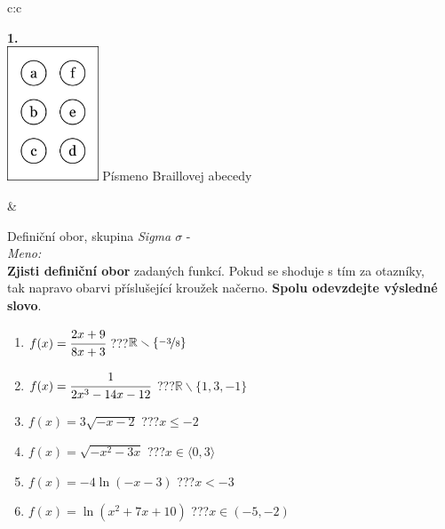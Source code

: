\documentclass[10pt]{report}
\begin{document}
\begin{tabular}{c:c}
\begin{minipage}[c][99mm][t]{0.49\linewidth}
\begin{center}
\begin{minipage}{0.20\linewidth}
\begin{center}
{\Huge\bfseries 1.} \\[2mm]
\includegraphics[height=40mm]{../images/braille.png}
{\small Písmeno Braillovej abecedy}
\end{center}
\end{minipage}
\end{center}
\end{minipage}
&
\begin{minipage}[c][99mm][t]{0.49\linewidth}
\begin{center}
\vspace{7mm}
{\huge Definiční obor, skupina \textit{Sigma $\sigma$} -}\\[4.5mm]
\textit{Meno:}\phantom{xxxxxxxxxxxxxxxxxxxxxxxxxxxxxxxxxxxxxxxxxxxxxxxxxxxxxxxxxxxxxxxxx}\\[3.5mm]
\textbf{Zjisti definiční obor} zadaných funkcí. Pokud se shoduje s tím za otazníky,\\tak napravo obarvi příslušející kroužek načerno. \textbf{Spolu odevzdejte výsledné slovo}.\\[3mm]
\begin{minipage}{0.77\linewidth}
\begin{center}
\begin{varwidth}{\textwidth}
\begin{enumerate}
\normalsize
\item $f(x)=\cfrac{2x+9}{8x+3}$\quad \dotfill\; ???\;\dotfill \quad $\mathbb{R}\smallsetminus\{\nicefrac{-3}{8}\}$
\item $f(x)=\cfrac{1}{2x^3-14x-12}$\quad \dotfill\; ???\;\dotfill \quad $\mathbb{R}\smallsetminus\{1,3,-1\}$
\item $f(x)=3\sqrt{-x-2}$\quad \dotfill\; ???\;\dotfill \quad $x\leq-2$
\item $f(x)=\sqrt{-x^2-3x}$\quad \dotfill\; ???\;\dotfill \quad $x\in\langle0 , 3\rangle$
\item $f(x)=-4\ln{(-x-3)}$\quad \dotfill\; ???\;\dotfill \quad $x<-3$
\item $f(x)=\ln{(x^2+7x+10)}$\quad \dotfill\; ???\;\dotfill \quad $x\in(-5 , -2)$

\end{enumerate}
\end{varwidth}
\end{center}
\end{minipage}
\end{center}
\end{minipage}
\end{tabular}
\end{document}
